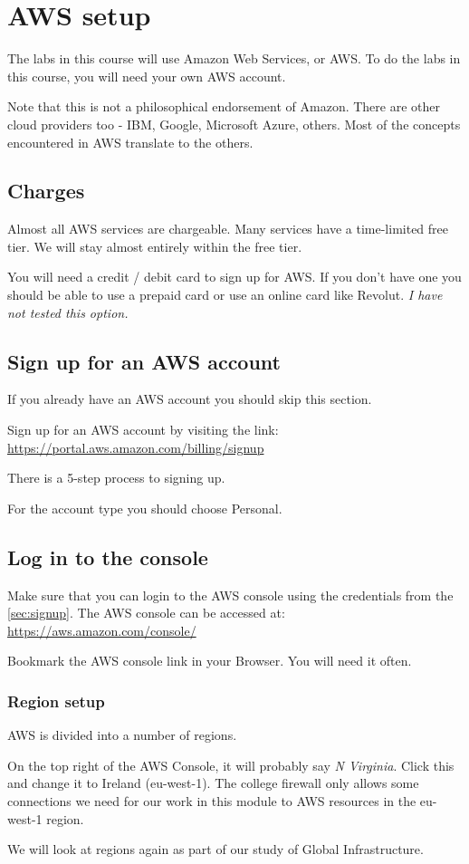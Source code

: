\chapter{AWS setup}
\label{ch:aws-setup}

The labs in this course will use Amazon Web Services, or AWS.
To do the labs in this course, you will need your own AWS account.

Note that this is not a philosophical endorsement of Amazon.
There are other cloud providers too - IBM, Google, Microsoft Azure, others.
Most of the concepts encountered in AWS translate to the others.

\section{Charges}
\label{sec:charges}

Almost all AWS services are chargeable.
Many services have a time-limited free tier.
We will stay almost entirely within the free tier. 

You will need a credit / debit card to sign up for AWS.
If you don't have one you should be able to use a prepaid card or use an online card like Revolut.
\textit{I have not tested this option.}

\section{Sign up for an AWS account}
\label{sec:signup}

If you already have an AWS account you should skip this section.

Sign up for an AWS account by visiting the link:\\
\url{https://portal.aws.amazon.com/billing/signup}

There is a 5-step process to signing up.

For the account type you should choose Personal.

\section{Log in to the console}

Make sure that you can login to the AWS console using the credentials from the \autoref{sec:signup}.
The AWS console can be accessed at:\\
\url{https://aws.amazon.com/console/}

Bookmark the AWS console link in your Browser. You will need it often.


\subsection{Region setup}
\label{sec:region-setup}

AWS is divided into a number of regions.

On the top right of the AWS Console, it will probably say \textit{N Virginia}.
Click this and change it to Ireland (eu-west-1).
The college firewall only allows some connections we need for our work in this module to AWS resources in the eu-west-1 region.

We will look at regions again as part of our study of Global Infrastructure.

